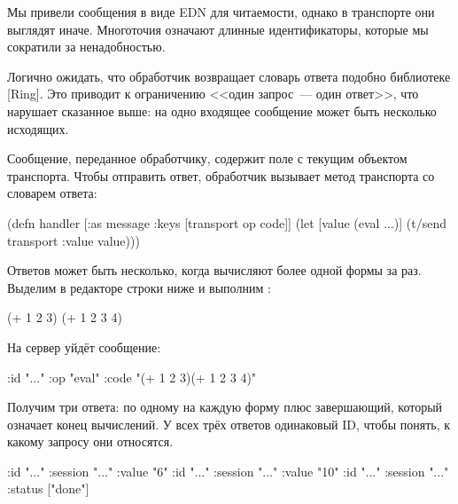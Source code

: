 Мы привели сообщения в виде EDN для читаемости, однако в транспорте они выглядят иначе. Многоточия означают длинные идентификаторы, которые мы сократили за ненадобностью.

Логично ожидать, что обработчик возвращает словарь ответа подобно библиотеке [Ring]. Это приводит к ограничению <<один запрос~--- один ответ>>, что нарушает сказанное выше: на одно входящее сообщение может быть несколько исходящих.

Сообщение, переданное обработчику, содержит поле  с текущим объектом транспорта. Чтобы отправить ответ, обработчик вызывает метод  транспорта со словарем ответа:

\begin{english}
  \begin{clojure}
(defn handler [{:as message
                :keys [transport op code]}]
  (let [value (eval ...)]
    (t/send transport {:value value})))
  \end{clojure}
\end{english}

Ответов может быть несколько, когда вычисляют более одной формы за раз. Выделим в редакторе строки ниже и выполним :

\begin{english}
  \begin{clojure}
(+ 1 2 3)
(+ 1 2 3 4)
  \end{clojure}
\end{english}

На сервер уйдёт сообщение:

\begin{english}
  \begin{clojure}
{:id "..." :op "eval" :code "(+ 1 2 3)(+ 1 2 3 4)"}
  \end{clojure}
\end{english}

Получим три ответа: по одному на каждую форму плюс завершающий, который означает конец вычислений. У всех трёх ответов одинаковый ID, чтобы понять, к какому запросу они относятся.

\begin{english}
  \begin{clojure}
{:id "..." :session "..." :value "6"}
{:id "..." :session "..." :value "10"}
{:id "..." :session "..." :status ["done"]}
  \end{clojure}
\end{english}

